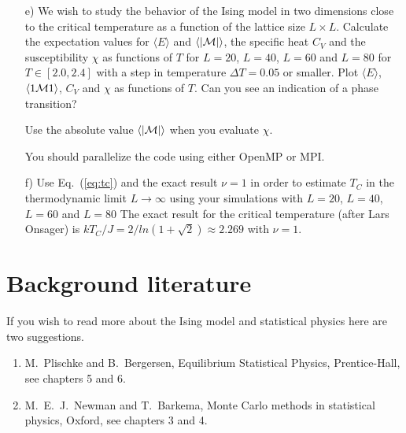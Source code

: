 \documentclass[11pt,a4wide]{article}
\begin{document}
\begin{enumerate}
\item [e)]  We wish to study the behavior of the Ising model in two dimensions close to the 
critical temperature as a function of the lattice size $L\times L$.
Calculate the expectation values 
for $\langle E\rangle$ and $\langle |{\cal M}|\rangle$,
the specific heat $C_V$ and the susceptibility $\chi$
as functions  of $T$ for $L=20$, $L=40$, $L=60$ and $L=80$ for $T\in [2.0,2.4]$
with a step in temperature $\Delta T=0.05$ or smaller. 
Plot  $\langle E\rangle$, $\langle 1{\cal M}1\rangle$, $C_V$ and $\chi$ 
as functions of $T$. Can you see an indication of a phase transition?

Use the absolute value $\langle |{\cal M}|\rangle$ when you evaluate $\chi$.

You should parallelize the code using either OpenMP or MPI.
\item[f)]  Use Eq.~(\ref{eq:tc}) and the exact result
$\nu=1$ in order to estimate $T_C$ in the thermodynamic limit $L\rightarrow \infty$
using your simulations with $L=20$, $L=40$, $L=60$ and $L=80$
The exact result for the critical temperature (after Lars Onsager) is
$kT_C/J=2/ln(1+\sqrt{2})\approx 2.269$ with $\nu=1$.
\end{enumerate}

\section*{Background literature}
If you wish to read more about the Ising model and statistical physics here are two suggestions.
\begin{enumerate}
\item M.~Plischke and B.~Bergersen, Equilibrium Statistical Physics,
Prentice-Hall, see chapters 5 and 6.
\item M.~E.~J.~Newman and T.~Barkema, Monte Carlo methods in statistical physics, Oxford, see chapters 3 and 4.

\end{enumerate}
\end{document}
